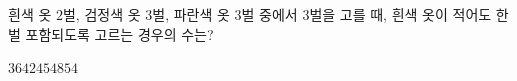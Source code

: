 \hspace*{2mm}\begin{minipage}[t]{\dimexpr\linewidth-2mm\relax}\vspace{0pt}
흰색 옷 $2$벌, 검정색 옷 $3$벌, 파란색 옷 $3$벌 중에서 $3$벌을 고를 때, 흰색 옷이 적어도 한 벌 포함되도록 고르는 경우의 수는? 
\begin{choices32}{$36$}{$42$}{$45$}{$48$}{$54$}\end{choices32}\end{minipage}
